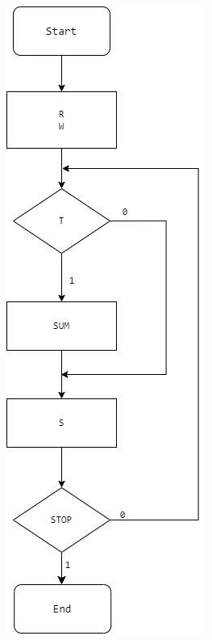 \documentclass[12pt,a4paper]{article}
\begin{document}
\begin{figure}[h!]
\begin{subfigure}[t]{0.45\textwidth}
        \end{subfigure}
        \hfill
        \begin{subfigure}[t]{0.45\textwidth}
            \centering
            \includegraphics[width=\linewidth]{FS_alg.png}
        \end{subfigure}
        
        \label{fig:microalg}

    \end{figure}
\end{document}

